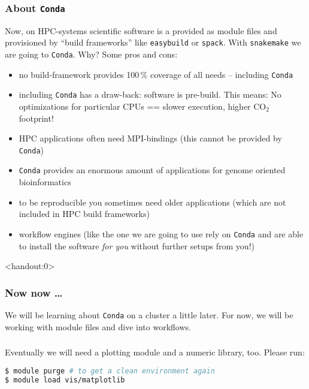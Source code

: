 \begin{frame}[fragile]
  \frametitle{About \texttt{Conda}}
  Now, on HPC-systems scientific software is a provided as module files and provisioned by ``build frameworks'' like \texttt{easybuild} or \texttt{spack}. With \texttt{snakemake} we are going to \texttt{Conda}. Why? Some pros and cons:\footnotesize
  \begin{itemize}[<+->]
   \item no build-framework provides 100\,\% coverage of all needs -- including \texttt{Conda}
   \item including \texttt{Conda} has a draw-back: software is pre-build. This means: No optimizations for particular CPUs == slower execution, higher CO$_2$ footprint!
   \item HPC applications often need MPI-bindings (this cannot be provided by \texttt{Conda})
   \item \texttt{Conda} provides an enormous amount of applications for genome oriented bioinformatics
   \item to be reproducible you sometimes need older applications (which are not included in HPC build frameworks)
   \item workflow engines (like the one we are going to use rely on \texttt{Conda} and are able to install the software \emph{for you} without further setups from you!)
  \end{itemize}
  \pause
\end{frame}

\begin{frame}<handout:0>
  \frametitle{Now now \ldots}
  We will be learning about \texttt{Conda} on a cluster a little later. For now, we will be working with module files and dive into workflows.
\end{frame}


\begin{frame}[fragile]
  \frametitle{}
  Eventually we will need a plotting module and a numeric library, too. Please run:
  \begin{lstlisting}[language=Bash, style=Shell]
$ module purge # to get a clean environment again
$ module load vis/matplotlib
  \end{lstlisting}
  \pause
\end{frame}

